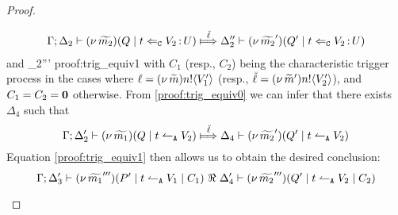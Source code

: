 \begin{proof}
\begin{enumerate}[1.]
\begin{enumerate}
							\begin{eqnarray}
							\horel{\Gamma}{\Delta_2}{\newsp{\widetilde{m_2}}{Q \Par \ftrigger{t}{V_2}{U}}}
							{\Hby{\mact{\ell}}}
							{\Delta_2''}{\newsp{\widetilde{m_2}'}{Q' \Par \ftrigger{t}{V_2}{U}}}
							\label{proof:trig_equiv0}
							\end{eqnarray}
							and
							{\fwb}
							{\Delta_2'''}{}
							{proof:trig_equiv1}
							with $C_1$ (resp., $C_2$) being the characteristic trigger process
							in the cases where $\ell = (\nu\, \widetilde{m}) n ! \langle V_1' \rangle$ (resp., $\breve{\ell} = (\nu\, \widetilde{m}') n ! \langle V_2' \rangle$),
							and $C_1 = C_2 = \mathbf{0}$ otherwise.
							From \eqref{proof:trig_equiv0} we can infer that there exists $\Delta_4$ such that
						\[
							\horel{\Gamma}{\Delta_2'}{\newsp{\widetilde{m_1}}{Q \Par \ntrigger{t}{V_2}}}
							{\Hby{\mact{\ell}}}
							{\Delta_4}{\newsp{\widetilde{m_2}'}{Q' \Par \ntrigger{t}{V_2}}}
						\]
							Equation \eqref{proof:trig_equiv1} then allows us to obtain the desired conclusion:
						\[
							\Gamma; \Delta_3' \vdash (\nu\, \widetilde{m_1}''')(P' \;|\; t \leftharpoonup_\mathtt{A} V_1 \;|\; C_1) \ \Re\  \Delta_4' \vdash{(\nu\, \widetilde{m_2}''')(Q' \;|\;t \leftharpoonup_\mathtt{A} V_2 \;|\;C_2)}
						\]


\end{enumerate}
\end{enumerate}
\end{proof}
